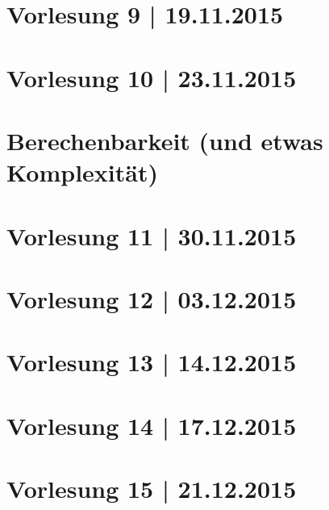 \newpage
\part*{Vorlesung 9 | 19.11.2015}

\newpage
\part*{Vorlesung 10 | 23.11.2015}


\newpage
\part[Berechenbarkeit]{Berechenbarkeit {\large (und etwas Komplexität)}}

\part*{Vorlesung 11 | 30.11.2015}

\newpage
\part*{Vorlesung 12 | 03.12.2015}


\newpage
\part*{Vorlesung 13 | 14.12.2015}

\newpage
\part*{Vorlesung 14 | 17.12.2015}

\newpage
\part*{Vorlesung 15 | 21.12.2015}


